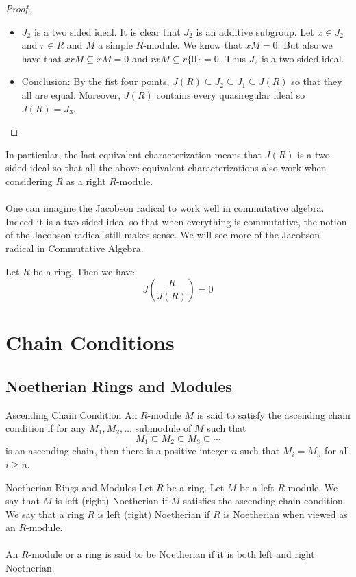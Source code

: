\documentclass[a4paper]{article}
\begin{document}
\begin{thm}{}{}
\begin{proof}
\begin{itemize}
\item $J_2$ is a two sided ideal. It is clear that $J_2$ is an additive subgroup. Let $x\in J_2$ and $r\in R$ and $M$ a simple $R$-module. We know that $xM=0$. But also we have that $xrM\subseteq xM=0$ and $rxM\subseteq r\{0\}=0$. Thus $J_2$ is a two sided-ideal. 

\item Conclusion: By the fist four points, $J(R)\subseteq J_2\subseteq J_1\subseteq J(R)$ so that they all are equal. Moreover, $J(R)$ contains every quasiregular ideal so $J(R)=J_3$. 
\end{itemize}
\end{proof}
\end{thm}

In particular, the last equivalent characterization means that $J(R)$ is a two sided ideal so that all the above equivalent characterizations also work when considering $R$ as a right $R$-module. \\~\\

One can imagine the Jacobson radical to work well in commutative algebra. Indeed it is a two sided ideal so that when everything is commutative, the notion of the Jacobson radical still makes sense. We will see more of the Jacobson radical in Commutative Algebra. 

\begin{lmm}{}{} Let $R$ be a ring. Then we have $$J\left(\frac{R}{J(R)}\right)=0$$
\end{lmm}

\pagebreak
\section{Chain Conditions}
\subsection{Noetherian Rings and Modules}
\begin{defn}{Ascending Chain Condition}{} An $R$-module $M$ is said to satisfy the ascending chain condition if for any $M_1,M_2,\dots$ submodule of $M$ such that $$M_1\subseteq M_2\subseteq M_3\subseteq\cdots$$ is an ascending chain, then there is a positive integer $n$ such that $M_i=M_n$ for all $i\geq n$. 
\end{defn}

\begin{defn}{Noetherian Rings and Modules}{} Let $R$ be a ring. Let $M$ be a left $R$-module. We say that $M$ is left (right) Noetherian if $M$ satisfies the ascending chain condition. We say that a ring $R$ is left (right) Noetherian if $R$ is Noetherian when viewed as an $R$-module. \\~\\

An $R$-module or a ring is said to be Noetherian if it is both left and right Noetherian. 
\end{defn}
\end{document}
